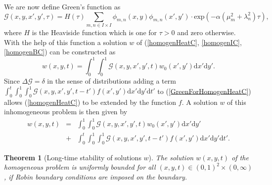 \documentclass[a4paper,11pt]{article}
\theoremstyle{plain} %
\newtheorem{theorem}{Theorem}[section]
\theoremstyle{definition} %
\theoremstyle{remark} %
\theoremstyle{remark}
\def\wTemp{w}
\def\Laplace{\Delta}
\def\Green{\mathscr{G}}
\begin{document}
We are now define Green's function as
\begin{equation}
\Green (x,y,x',y',\tau ) = H(\tau ) \sum_{m,n \in I \times I } \phi_{m,n} (x,y) \phi_{m,n} (x', y' ) \cdot \mathrm{exp} (-\alpha (\mu^2_m + \lambda^2_n) \tau ),
\end{equation}
where $H$ is the Heaviside function which is one for $\tau > 0 $ and zero otherwise. With the help of this function a solution $ \wTemp $ of (\ref{homogenHeatC}, \ref{homogenIC}, \ref{homogenBC}) can be constructed as
\begin{equation}
\wTemp (x,y,t)  = \int_0^1 \int_0^1  \Green (x,y,x',y', t ) \wTemp_0 (x',y') \mathrm{d}x' \mathrm{d}y' .
\end{equation} \label{GreenForHomogenHeatC}
Since $ \Laplace \Green = \delta $ in the sense of distributions adding a term $ \int_0^t\int_0^1 \int_0^1  \Green (x,y,x',y',t -t' ) f (x',y') \mathrm{d}x' \mathrm{d}y' \mathrm{d}t' $ to (\ref{GreenForHomogenHeatC}) allows (\ref{homogenHeatC}) to be extended by the function $f$. A solution $\wTemp$ of this inhomogeneous problem is then given by
\begin{eqnarray} \label{GreenForPartiallyInhomogenHeatC}
\wTemp (x,y,t)  & = & \int_0^1\!\int_0^1  \Green (x,y,x',y', t ) \wTemp_0 (x',y') \mathrm{d}x' \mathrm{d}y' \\
& + & \int_0^t\!\int_0^1\!\int_0^1  \Green (x,y,x',y',t -t' ) f (x',y') \mathrm{d}x' \mathrm{d}y' \mathrm{d}t' . \label{GreenForPartiallyInhomogenHeatC2}
\end{eqnarray}

\begin{theorem}[Long-time stability of solutions $w$] \label{w_stability_robin_bc}
The solution $w (x,y, t) $ of the homogeneous problem is uniformly bounded for all $(x,y, t) \in (0,1)^2 \times (0,\infty) $, if Robin boundary conditions are imposed on the boundary.
\end{theorem}
\end{document}
